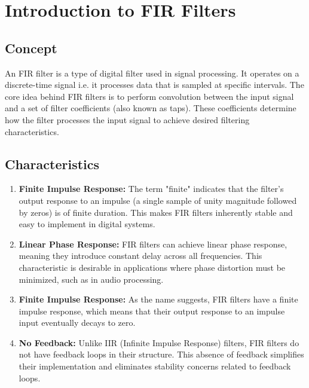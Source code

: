 \documentclass{zc-ust-hw}
\begin{document}
\maketitle
\vspace*{-2.5em}
\tableofcontents
\listoffigures

\newpage

\section{Introduction to FIR Filters}

\subsection{Concept} An FIR filter is a type of digital filter used in
signal processing. It operates on a discrete-time signal i.e. it
processes data that is sampled at specific intervals. The core idea
behind FIR filters is to perform convolution between the input signal
and a set of filter coefficients (also known as taps). These
coefficients determine how the filter processes the input signal to
achieve desired filtering characteristics.

\subsection{Characteristics}
\begin{enumerate}
  \item \textbf{Finite Impulse Response:} The term "finite" indicates
    that the filter's output response to an impulse (a single sample of
    unity magnitude followed by zeros) is of finite duration. This
    makes FIR filters inherently stable and easy to implement in
    digital systems.
  \item \textbf{Linear Phase Response:} FIR filters can achieve linear
    phase response, meaning they introduce constant delay across all
    frequencies. This characteristic is desirable in applications where
    phase distortion must be minimized, such as in audio processing.
  \item \textbf{Finite Impulse Response:} As the name suggests, FIR
    filters have a finite impulse response, which means that their
    output response to an impulse input eventually decays to zero.
  \item \textbf{No Feedback:} Unlike IIR (Infinite Impulse Response)
    filters, FIR filters do not have feedback loops in their structure.
    This absence of feedback simplifies their implementation and
    eliminates stability concerns related to feedback loops.
\end{enumerate}
\end{document}
